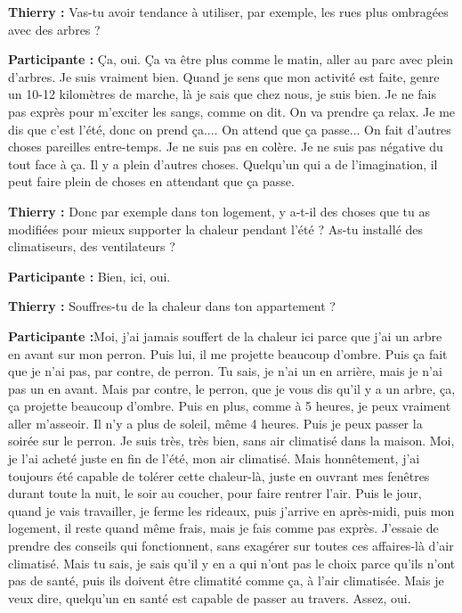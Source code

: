 \textbf{Thierry :} Vas-tu avoir tendance à utiliser, par exemple, les rues plus ombragées avec des arbres ?

\textbf{Participante :} Ça, oui. Ça va être plus comme le matin, aller au parc avec plein d'arbres. Je suis vraiment bien. Quand je sens que mon activité est faite, genre un 10-12 kilomètres de marche, là je sais que chez nous, je suis bien. Je ne fais pas exprès pour m'exciter les sangs, comme on dit. On va prendre ça relax. Je me dis que c'est l'été, donc on prend ça.... On attend que ça passe... On fait d'autres choses pareilles entre-temps. Je ne suis pas en colère. Je ne suis pas négative du tout face à ça. Il y a plein d'autres choses. Quelqu'un qui a de l'imagination, il peut faire plein de choses en attendant que ça passe.

\textbf{Thierry :} Donc par exemple dans ton logement, y a-t-il des choses que tu as modifiées pour mieux supporter la chaleur pendant l'été ? As-tu installé des climatiseurs, des ventilateurs ?

\textbf{Participante :} Bien, ici, oui.

\textbf{Thierry :} Souffres-tu de la chaleur dans ton appartement ?

\textbf{Participante :}Moi, j'ai jamais souffert de la chaleur ici parce que j'ai un arbre en avant sur mon perron. Puis lui, il me projette beaucoup d'ombre. Puis ça fait que je n'ai pas, par contre, de perron. Tu sais, je n'ai un en arrière, mais je n'ai pas un en avant. Mais par contre, le perron, que je vous dis qu'il y a un arbre, ça, ça projette beaucoup d'ombre. Puis en plus, comme à 5 heures, je peux vraiment aller m'asseoir. Il n'y a plus de soleil, même 4 heures. Puis je peux passer la soirée sur le perron. Je suis très, très bien, sans air climatisé dans la maison. Moi, je l'ai acheté juste en fin de l'été, mon air climatisé. Mais honnêtement, j'ai toujours été capable de tolérer cette chaleur-là, juste en ouvrant mes fenêtres durant toute la nuit, le soir au coucher, pour faire rentrer l'air. Puis le jour, quand je vais travailler, je ferme les rideaux, puis j'arrive en après-midi, puis mon logement, il reste quand même frais, mais je fais comme pas exprès. J'essaie de prendre des conseils qui fonctionnent, sans exagérer sur toutes ces affaires-là d'air climatisé. Mais tu sais, je sais qu'il y en a qui n'ont pas le choix parce qu'ils n'ont pas de santé, puis ils doivent être climatité comme ça, à l'air climatisée. Mais je veux dire, quelqu'un en santé est capable de passer au travers. Assez, oui. 

